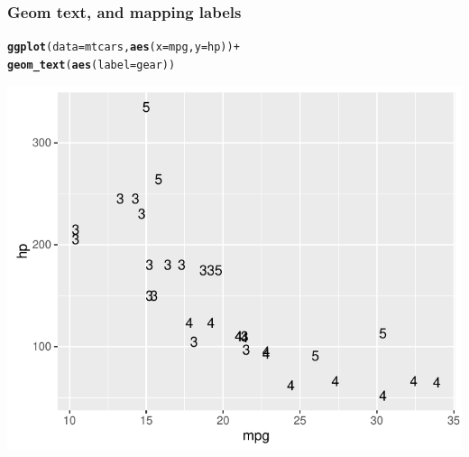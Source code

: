 \documentclass[12pt]{beamer}\usepackage[]{graphicx}\usepackage[]{color}
\makeatletter
\newcommand{\hlopt}[1]{\textcolor[rgb]{0,0,0}{#1}}%
\newcommand{\hlstd}[1]{\textcolor[rgb]{0.345,0.345,0.345}{#1}}%
\newcommand{\hlkwc}[1]{\textcolor[rgb]{0.333,0.667,0.333}{#1}}%
\newcommand{\hlkwd}[1]{\textcolor[rgb]{0.737,0.353,0.396}{\textbf{#1}}}%
\newenvironment{kframe}{%
 \def\at@end@of@kframe{}%
 \ifinner\ifhmode%
  \def\at@end@of@kframe{\end{minipage}}%
  \begin{minipage}{\columnwidth}%
 \fi\fi%
 \def\FrameCommand##1{\hskip\@totalleftmargin \hskip-\fboxsep
 \colorbox{shadecolor}{##1}\hskip-\fboxsep
     \hskip-\linewidth \hskip-\@totalleftmargin \hskip\columnwidth}%
 \MakeFramed {\advance\hsize-\width
   \@totalleftmargin\z@ \linewidth\hsize
   \@setminipage}}%
 {\par\unskip\endMakeFramed%
 \at@end@of@kframe}
\newenvironment{knitrout}{}{} %
\makeatother
\begin{document}

\begin{frame}[fragile]
\frametitle{Geom text, and mapping labels}
\begin{knitrout}\scriptsize
{}\color{fgcolor}\begin{kframe}
\begin{alltt}
\hlkwd{ggplot}\hlstd{(}\hlkwc{data} \hlstd{= mtcars,} \hlkwd{aes}\hlstd{(}\hlkwc{x} \hlstd{= mpg,} \hlkwc{y} \hlstd{= hp))} \hlopt{+}
  \hlkwd{geom_text}\hlstd{(}\hlkwd{aes}\hlstd{(}\hlkwc{label} \hlstd{= gear))}
\end{alltt}
\end{kframe}

{\centering \includegraphics[width=.7\linewidth,height=.6\linewidth]{figure/xyplot_mtcars9-1} 

}



\end{knitrout}

\end{frame}

\end{document}

